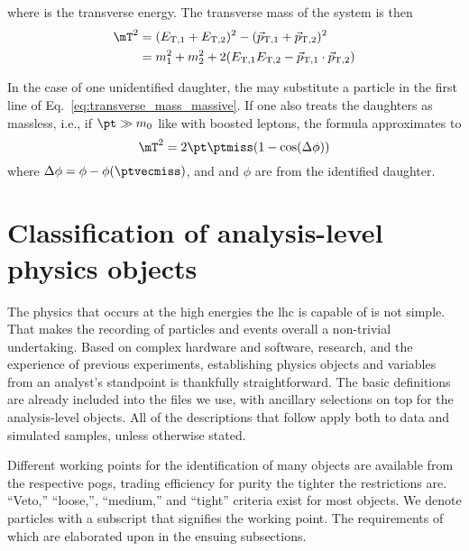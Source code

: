 where \ET is the transverse energy. The transverse mass of the system is then
\begin{equation}
    \begin{aligned}
\mT^2 &= (E_{\mathrm{T,1}} + E_{\mathrm{T,2}})^2 - ({\vec p}_{\mathrm{T,1}} + {\vec p}_{\mathrm{T,2}})^2 \\
&= m_1^2 + m_2^2 + 2(E_{\mathrm{T,1}} E_{\mathrm{T,2}} - {\vec p}_{\mathrm{T,1}} \cdot {\vec p}_{\mathrm{T,2}})
    \end{aligned}
\label{eq:transverse_mass_massive}
\end{equation}

In the case of one unidentified daughter, the \ptvecmiss may substitute a particle in the first line of Eq.~\ref{eq:transverse_mass_massive}. If one also treats the daughters as massless, i.e., if $\pt \gg m_0$ like with boosted leptons, the formula approximates to
\begin{equation}
\mT^2 = 2 \pt \ptmiss (1 - \cos(\Delta\phi))
\label{eq:transverse_mass_massless}
\end{equation}
where $\Delta\phi = \phi - \phi(\ptvecmiss)$, and \pt and $\phi$ are from the identified daughter.




\section{Classification of analysis-level physics objects}
\label{sec:analysis_objects}

The physics that occurs at the high energies the \acrshort{lhc} is capable of is not simple. That makes the recording of particles and events overall a non-trivial undertaking. Based on complex hardware and software, research, and the experience of previous experiments, establishing physics objects and variables from an analyst's standpoint is thankfully straightforward. The basic definitions are already included into the \ROOT files we use, with ancillary selections on top for the analysis-level objects. All of the descriptions that follow apply both to data and simulated samples, unless otherwise stated.

Different working points for the identification of many objects are available from the respective \glspl{pog}, trading efficiency for purity the tighter the restrictions are. ``Veto,'' ``loose,'', ``medium,'' and ``tight'' criteria exist for most objects. We denote particles with a subscript that signifies the working point. The requirements of which are elaborated upon in the ensuing subsections.


